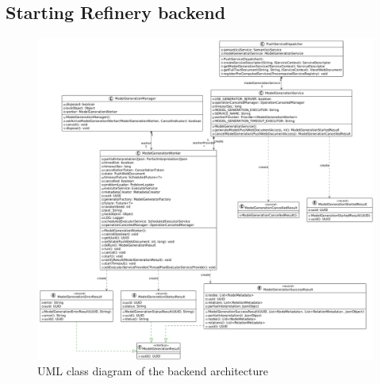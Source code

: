 \appendix
\chapter*{\fuggelek}
\setcounter{chapter}{\appendixnumber}

\section{Starting Refinery backend} \label{startingbackenduml}
\begin{figure}[h!]
		\includegraphics[scale=0.3]{include/imgs/backendUML.png}
		\caption{UML class diagram of the backend architecture}
		\label{backendstarteruml}
\end{figure}

